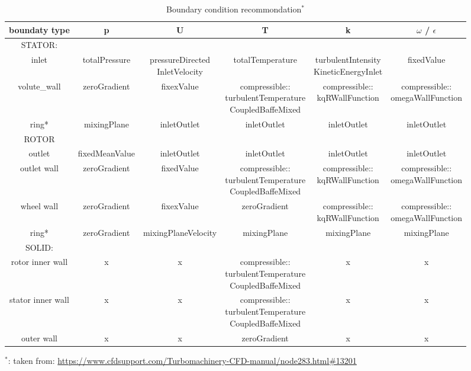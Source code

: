 \documentclass{article}
\begin{document}
\begin{landscape}
\begin{table}[h!]
    \centering
\begin{tabular}{cccccc}

\hline
boundaty type & p & U  & T & k & $\omega$ / $\epsilon$\\  
\hline
   	 	STATOR:	 \\
   	 	\hline
inlet &	totalPressure &	\makecell{pressureDirected\\InletVelocity} &	totalTemperature &	\makecell{turbulentIntensity\\KineticEnergyInlet} &	fixedValue   \\
volute\_wall &	zeroGradient &	fixexValue &	\makecell{compressible::\\turbulentTemperature\\CoupledBaffeMixed} &	\makecell{compressible::\\kqRWallFunction}	 & \makecell{compressible::\\omegaWallFunction}\\
ring* &	mixingPlane &	inletOutlet &	inletOutlet &	 inletOutlet &	inletOutlet\\
\hline	 	 	 	  
 	 	ROTOR	 	 	 \\
 	 	\hline
outlet &	fixedMeanValue &	inletOutlet &	inletOutlet	 & inletOutlet &	inletOutlet \\
outlet wall &	zeroGradient &	fixedValue	 & \makecell{compressible::\\turbulentTemperature\\CoupledBaffeMixed}	 & \makecell{compressible::\\kqRWallFunction} &	\makecell{compressible::\\omegaWallFunction} \\
wheel wall &	zeroGradient &	fixexValue &	zeroGradient	 & \makecell{compressible::\\kqRWallFunction} & 	\makecell{compressible::\\omegaWallFunction} \\
ring* &	zeroGradient &	mixingPlaneVelocity &	mixingPlane &	mixingPlane &	mixingPlane \\
\hline	 	 	 	 	  
 	 	SOLID:	 	 	 \\
 	 	\hline
rotor inner wall &	x &	x &	\makecell{compressible::\\turbulentTemperature\\CoupledBaffeMixed} &	x &	x \\
stator inner wall &	x &	x &	\makecell{compressible::\\turbulentTemperature\\CoupledBaffeMixed} &	x &	x \\
outer wall &	x &	x &	zeroGradient &	x &	x \\

  \hline

\end{tabular}
    \caption{Boundary condition recommondation$^*$}
    \label{tab:CFD-support recomm}
\end{table}

$^*$: taken from: 
\url{https://www.cfdsupport.com/Turbomachinery-CFD-manual/node283.html\#13201}
\end{landscape}
\end{document}

